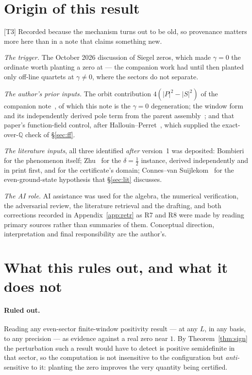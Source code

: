 \documentclass[11pt,a4paper]{article}
\theoremstyle{remark}
\newcommand{\tier}[1]{{\small\textsf{[#1]}}}
\begin{document}
\section{Origin of this result}\label{sec:origin}

\tier{T3} Recorded because the mechanism turns out to be old, so provenance matters more
here than in a note that claims something new.

\emph{The trigger.} The October 2026 discussion of Siegel zeros, which made $\gamma=0$ the
ordinate worth planting a zero at --- the companion work had until then planted only
off-line quartets at $\gamma\ne0$, where the sectors do not separate.

\emph{The author's prior inputs.} The orbit contribution $4(|P|^2-|S|^2)$ of the companion
note~\cite[eq.~(4)]{DHnote}, of which this note is the $\gamma=0$ degeneration; the window
form and its independently derived pole term from the parent assembly~\cite{deltaL3}; and
that paper's function-field control, after Hallouin--Perret~\cite{HP19}, which supplied the
exact-over-$\mathbb Q$ check of \S\ref{sec:ff}.

\emph{The literature inputs}, all three identified \emph{after} version~1 was deposited:
Bombieri~\cite[\S9]{Bombieri} for the phenomenon itself; Zhu~\cite[Lem.~6.1]{Zhu} for the
$\delta=\tfrac12$ instance, derived independently and in print first, and
\cite[Cor.~6.3]{Zhu} for the certificate's domain; Connes--van Suijlekom~\cite{CvS} for the
even-ground-state hypothesis that \S\ref{sec:lit} discusses.

\emph{The AI role.} AI assistance was used for the algebra, the numerical verification, the
adversarial review, the literature retrieval and the drafting, and both corrections recorded
in Appendix~\ref{app:retr} as R7 and R8 were made by reading primary sources rather than
summaries of them. Conceptual direction, interpretation and final responsibility are the
author's.

\section{What this rules out, and what it does not}

\paragraph{Ruled out.} Reading any even-sector finite-window positivity result --- at any
$L$, in any basis, to any precision --- as evidence against a real zero near $1$. By
Theorem~\ref{thm:sign} the perturbation such a result would have to detect is positive
semidefinite in that sector, so the computation is not insensitive to the configuration but
\emph{anti-}sensitive to it: planting the zero improves the very quantity being certified.
\end{document}
